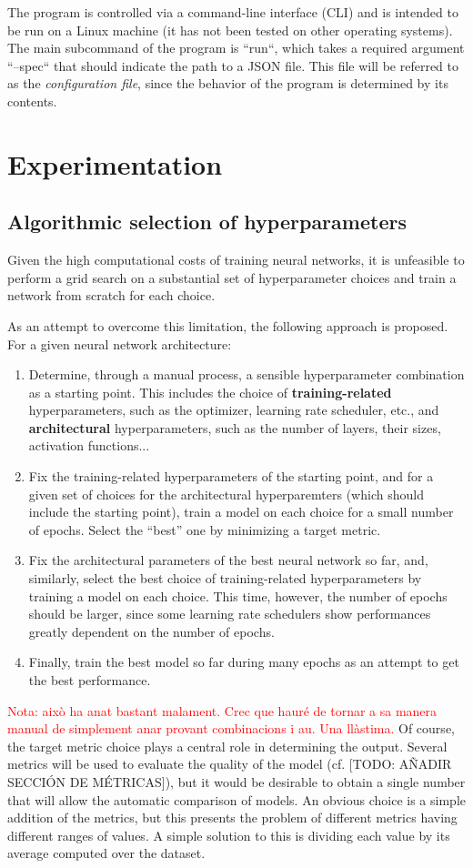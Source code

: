 \documentclass[twocolumn,twoside,a4paper,10pt]{IEEEtran}
\newcommand{\Frank}[1]{\textcolor{red}{#1}}
\begin{document}
The program is controlled via a command-line interface (CLI) and is intended to be run on a Linux machine (it has not been tested on other operating systems). The main subcommand of the program is ``run``, which takes a required argument ``--spec`` that should indicate the path to a JSON file. This file will be referred to as the \textit{configuration file}, since the behavior of the program
is determined by its contents.

\section{Experimentation}
\subsection{Algorithmic selection of hyperparameters}
Given the high computational costs of training neural networks, it is unfeasible to perform a grid search on a substantial set of hyperparameter choices and train a network from scratch for each choice.

As an attempt to overcome this limitation, the following approach is proposed. For a given neural network architecture:
\begin{enumerate}
  \item Determine, through a manual process, a sensible hyperparameter combination as a starting point. This includes the choice of \textbf{training-related} hyperparameters, such as the optimizer, learning rate scheduler, etc., and \textbf{architectural} hyperparameters, such as the number of layers, their sizes, activation functions...
  \item Fix the training-related hyperparameters of the starting point, and for a given set of choices for the architectural hyperparemters (which should include the starting point), train a model on each choice for a small number of epochs. Select the ``best'' one by minimizing a target metric.
  \item Fix the architectural parameters of the best neural network so far, and, similarly, select the best choice of training-related hyperparameters by training a model on each choice. This time, however, the number of epochs should be larger, since some learning rate schedulers show performances greatly dependent on the number of epochs.
  \item Finally, train the best model so far during many epochs as an attempt to get the best performance.
\end{enumerate}
\Frank{Nota: això ha anat bastant malament. Crec que hauré de tornar a sa manera manual de simplement anar provant combinacions i au. Una llàstima.}
Of course, the target metric choice plays a central role in determining the output. Several metrics will be used to evaluate the quality of the model (cf. [TODO: AÑADIR SECCIÓN DE MÉTRICAS]), but it would be desirable to obtain a single number that will allow the automatic comparison of models. An obvious choice is a simple addition of the metrics, but this presents the problem of different metrics having different ranges of values. A simple solution to this
is dividing each value by its average computed over the dataset.
\end{document}
